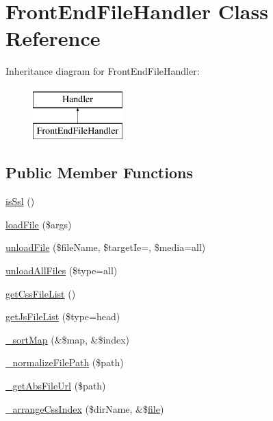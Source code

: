 \hypertarget{classFrontEndFileHandler}{}\section{Front\+End\+File\+Handler Class Reference}
\label{classFrontEndFileHandler}
Inheritance diagram for Front\+End\+File\+Handler\+:\begin{figure}[H]
\begin{center}
\leavevmode
\includegraphics[height=2.000000cm]{classFrontEndFileHandler}
\end{center}
\end{figure}
\subsection*{Public Member Functions}
\begin{DoxyCompactItemize}
\item 
\hyperlink{classFrontEndFileHandler_a2bd70c621572f784c4e563d0dafa0fc2}{is\+Ssl} ()
\item 
\hyperlink{classFrontEndFileHandler_aeb802ae7b7b315da73ec3be224ce9e9f}{load\+File} (\$args)
\item 
\hyperlink{classFrontEndFileHandler_ae7f4b5068de1b01d883ee4cf26b9c3c5}{unload\+File} (\$file\+Name, \$target\+Ie=\textquotesingle{}\textquotesingle{}, \$media=\textquotesingle{}all\textquotesingle{})
\item 
\hyperlink{classFrontEndFileHandler_ad31d9887bc8b135b4b26f8fb225abe43}{unload\+All\+Files} (\$type=\textquotesingle{}all\textquotesingle{})
\item 
\hyperlink{classFrontEndFileHandler_a35cff5fb32625790d01e8839c73fd0fc}{get\+Css\+File\+List} ()
\item 
\hyperlink{classFrontEndFileHandler_a389b800cc8bef5a1a3dfd93880fb7f2a}{get\+Js\+File\+List} (\$type=\textquotesingle{}head\textquotesingle{})
\item 
\hyperlink{classFrontEndFileHandler_a3677abdd2a1a3a17fd1de9f58ffe27a5}{\+\_\+sort\+Map} (\&\$map, \&\$index)
\item 
\hyperlink{classFrontEndFileHandler_a4818293d9395dd1b4d62b8cabeb04603}{\+\_\+normalize\+File\+Path} (\$path)
\item 
\hyperlink{classFrontEndFileHandler_a0a76e82d6037ea9a862e1585b2e562df}{\+\_\+get\+Abs\+File\+Url} (\$path)
\item 
\hyperlink{classFrontEndFileHandler_aedfe6ba984a8e33de211ef23e83cd98e}{\+\_\+arrange\+Css\+Index} (\$dir\+Name, \&\$\hyperlink{classfile}{file})
\end{DoxyCompactItemize}
